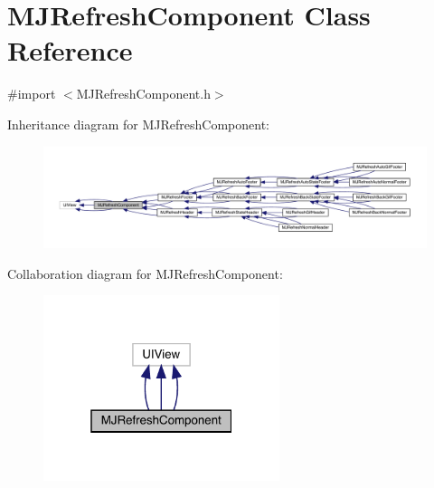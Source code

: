 \hypertarget{interface_m_j_refresh_component}{}\section{M\+J\+Refresh\+Component Class Reference}
\label{interface_m_j_refresh_component}


{\ttfamily \#import $<$M\+J\+Refresh\+Component.\+h$>$}



Inheritance diagram for M\+J\+Refresh\+Component\+:\nopagebreak
\begin{figure}[H]
\begin{center}
\leavevmode
\includegraphics[width=350pt]{interface_m_j_refresh_component__inherit__graph}
\end{center}
\end{figure}


Collaboration diagram for M\+J\+Refresh\+Component\+:\nopagebreak
\begin{figure}[H]
\begin{center}
\leavevmode
\includegraphics[width=196pt]{interface_m_j_refresh_component__coll__graph}
\end{center}
\end{figure}
